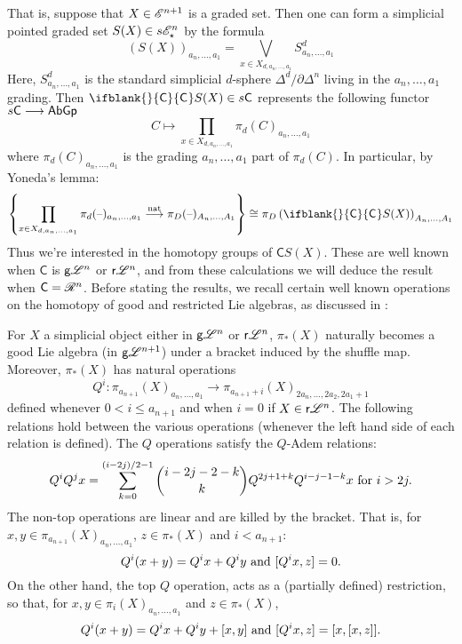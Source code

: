 \documentclass[11pt]{article}
\newcommand{\GS}[1]{\scrE^{#1}}
\newcommand{\GpS}[1]{\scrE^{#1}_\star}
\newcommand{\RestLie}[1]{\mathsf{r}{\scrL}^{#1}}%
\newcommand{\GoodLie}[1]{\mathsf{g}{\scrL}^{#1}}%
\newcommand{\PRLie}[1]{\scrR^{#1}}%
\newcommand{\Fr}[2][]{\ifblank{#1}{#2}{#2_{#1}}}
\renewcommand{\Q}{Q}
\begin{document}
\begin{CategoriesOfInterest}
That is, suppose that $X\in\GS{n+1}$ is a graded set. Then one can form a simplicial pointed graded set $S(X)\in s\GpS{n}$ by the formula
\[(S(X))_{a_n,\ldots,a_1}=\bigvee_{x\in X_{d,a_n,\ldots,a_1}}S^d_{a_n,\ldots,a_1}\]
Here, $S^d_{a_n,\ldots,a_1}$ is the standard simplicial $d$-sphere $\Delta^d/\partial\Delta^n$ living in the $a_n,\ldots,a_1$ grading.
Then $\Fr{\mathsf{C}}S(X)\in s\mathsf{C}$ represents the following functor $s\mathsf{C}\longrightarrow\operatorname{{\mathsf{AbGp}}}$
\[C\mapsto \prod_{x\in X_{d,a_n,\ldots,a_1}}\pi_d(C)_{a_n,\ldots,a_1}\]
where $\pi_d(C)_{a_n,\ldots,a_1}$ is the grading $a_n,\ldots,a_1$ part of $\pi_d(C)$. In particular, by Yoneda's lemma:
\[\left\{\prod_{x\in X_{d,a_n,\ldots,a_1}}\pi_d(\DASH)_{a_n,\ldots,a_1}\overset{\textup{nat}}{\to}\pi_D(\DASH)_{A_n,\ldots,A_1}\right\}\cong\pi_D\left(\Fr{\mathsf{C}}S(X)\right)_{A_n,\ldots,A_1}\]
Thus we're interested in the homotopy groups of $\mathsf{C}S(X)$. These are well known when $\mathsf{C}$ is $\GoodLie{n}$ or $\RestLie{n}$, and from these calculations we will deduce the result when $\mathsf{C}=\PRLie{n}$. Before stating the results, we recall certain well known operations on the homotopy of good and restricted Lie algebras, as discussed in \cite[Thm 7.12, Prop 8.8]{CurtisSimplicialHtpy.pdf}:
\begin{prop*}
For $X$ a simplicial object either in $\GoodLie{n}$ or $\RestLie{n}$, $\pi_{*}(X)$ naturally becomes a good Lie algebra (in $\GoodLie{n+1}$) under a bracket induced by the shuffle map. Moreover, $\pi_{*}(X)$ has natural operations
\[\Q^i:\pi_{a_{n+1}}(X)_{a_n,\ldots,a_1}\to \pi_{a_{n+1}+i}(X)_{2a_n,\ldots,2a_2,2a_1+1}
\]
defined whenever $0<i\leq a_{n+1}$ and when $i=0$ if $X\in\RestLie{n}$. The following relations hold between the various operations (whenever the left hand side of each relation is defined).
The $\Q$ operations satisfy the $\Q$-Adem relations:%
\[\Q^i\Q^jx=\sum_{k=0}^{(i-2j)/2-1}{i-2j-2-k\choose k}\Q^{2j+1+k}\Q^{i-j-1-k}x\textup{ for }i>2j.\]
The non-top operations are linear and are killed by the bracket.
That is, for $x,y\in \pi_{a_{n+1}}(X)_{a_n,\ldots,a_1}$, $z\in \pi_*(X)$ and $i<a_{n+1}$: \[\Q^i{(x+y)}=\Q^i{x}+\Q^i{y}\textup{ and }[\Q^i{x},z]=0.\]
On the other hand, the top $\Q$ operation, 
acts as a (partially defined) restriction, so that, for $x,y\in \pi_i(X)_{ a_{n},\ldots,a_1}$ and $z\in \pi_*(X)$,
\[\Q^i(x+y)=\Q^ix+\Q^iy+[x,y]\textup{ and }[\Q^{i}x,z]=[x,[x,z]].\]


\end{prop*}
\end{CategoriesOfInterest}
\end{document}
